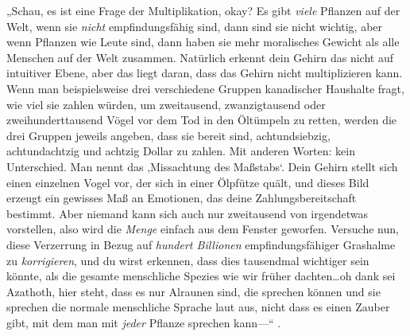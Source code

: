 „Schau, es ist eine Frage der Multiplikation, okay? Es gibt \emph{viele} Pflanzen auf der Welt, wenn sie \emph{nicht} empfindungsfähig sind, dann sind sie nicht wichtig, aber wenn Pflanzen wie Leute sind, dann haben sie mehr moralisches Gewicht als alle Menschen auf der Welt zusammen. Natürlich erkennt dein Gehirn das nicht auf intuitiver Ebene, aber das liegt daran, dass das Gehirn nicht multiplizieren kann. Wenn man beispielsweise drei verschiedene Gruppen kanadischer Haushalte fragt, wie viel sie zahlen würden, um zweitausend, zwanzigtausend oder zweihunderttausend Vögel vor dem Tod in den Öltümpeln zu retten, werden die drei Gruppen jeweils angeben, dass sie bereit sind, achtundsiebzig, achtundachtzig und achtzig Dollar zu zahlen. Mit anderen Worten: kein Unterschied. Man nennt das ‚Missachtung des Maßstabs‘. Dein Gehirn stellt sich einen einzelnen Vogel vor, der sich in einer Ölpfütze quält, und dieses Bild erzeugt ein gewisses Maß an Emotionen, das deine Zahlungsbereitschaft bestimmt. Aber niemand kann sich auch nur zweitausend von irgendetwas vorstellen, also wird die \emph{Menge} einfach aus dem Fenster geworfen. Versuche nun, diese Verzerrung in Bezug auf \emph{hundert Billionen} empfindungsfähiger Grashalme zu \emph{korrigieren}, und du wirst erkennen, dass dies tausendmal wichtiger sein könnte, als die gesamte menschliche Spezies wie wir früher dachten…oh dank sei Azathoth, hier steht, dass es nur Alraunen sind, die sprechen können und sie sprechen die normale menschliche Sprache laut aus, nicht dass es einen Zauber gibt, mit dem man mit \emph{jeder} Pflanze sprechen kann—“ .


